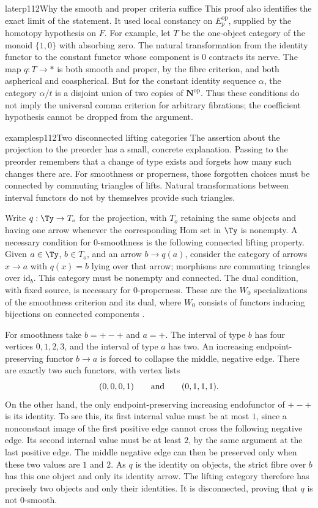 \begin{dcomment}{later}{p112}{Why the smooth and proper criteria suffice}
This proof also identifies the exact limit of the statement. It used local constancy on $E_p^{\mathrm{op}}$, supplied by the homotopy hypothesis on $F$. For example, let $T$ be the one-object category of the monoid $\{1,0\}$ with absorbing zero. The natural transformation from the identity functor to the constant functor whose component is $0$ contracts its nerve. The map $q:T\to *$ is both smooth and proper, by the fibre criterion, and both aspherical and coaspherical. But for the constant identity sequence $\alpha$, the category $\alpha/t$ is a disjoint union of two copies of $\mathbf N^{\mathrm{op}}$. Thus these conditions do not imply the universal comma criterion for arbitrary fibrations; the coefficient hypothesis cannot be dropped from the argument.
\end{dcomment}

\begin{dcomment}{examples}{p112}{Two disconnected lifting categories}
The assertion about the projection to the preorder has a small, concrete explanation.  Passing to the preorder remembers that a change of type exists and forgets how many such changes there are.  For smoothness or properness, those forgotten choices must be connected by commuting triangles of lifts.  Natural transformations between interval functors do not by themselves provide such triangles.

Write $q:\Ty\to T_o$ for the projection, with $T_o$ retaining the same objects and having one arrow whenever the corresponding Hom set in $\Ty$ is nonempty.  A necessary condition for $0$-smoothness is the following connected lifting property.  Given $a\in\Ty$, $b\in T_o$, and an arrow $b\to q(a)$, consider the category of arrows $x\to a$ with $q(x)=b$ lying over that arrow; morphisms are commuting triangles over $\mathrm{id}_b$.  This category must be nonempty and connected.  The dual condition, with fixed source, is necessary for $0$-properness.  These are the $W_0$ specializations of the smoothness criterion and its dual, where $W_0$ consists of functors inducing bijections on connected components \citep[Theorem~1.2(b), p.~4]{Maltsiniotis2005Asphericite}.

For smoothness take $b=+-+$ and $a=+$.  The interval of type $b$ has four vertices $0,1,2,3$, and the interval of type $a$ has two.  An increasing endpoint-preserving functor $b\to a$ is forced to collapse the middle, negative edge.  There are exactly two such functors, with vertex lists
\[
 (0,0,0,1)\qquad\hbox{and}\qquad(0,1,1,1).
\]
On the other hand, the only endpoint-preserving increasing endofunctor of $+-+$ is its identity.  To see this, its first internal value must be at most $1$, since a nonconstant image of the first positive edge cannot cross the following negative edge.  Its second internal value must be at least $2$, by the same argument at the last positive edge.  The middle negative edge can then be preserved only when these two values are $1$ and $2$.  As $q$ is the identity on objects, the strict fibre over $b$ has this one object and only its identity arrow.  The lifting category therefore has precisely two objects and only their identities.  It is disconnected, proving that $q$ is not $0$-smooth.


\end{dcomment}
